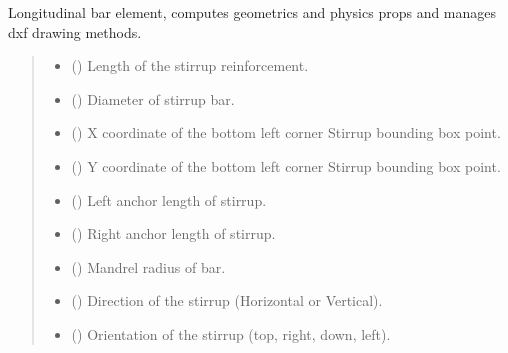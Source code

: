 \documentclass[a4paper,10pt,english]{sphinxmanual}
\begin{document}
\begin{fulllineitems}
\pysigstopsignatures
\sphinxAtStartPar
Longitudinal bar element, computes geometrics and physics props and manages dxf drawing methods.
\begin{quote}\begin{description}
\begin{itemize}
\item {} 
\sphinxAtStartPar
{} () \textendash{} Length of the stirrup reinforcement.

\item {} 
\sphinxAtStartPar
{} () \textendash{} Diameter of stirrup bar.

\item {} 
\sphinxAtStartPar
{} () \textendash{} X coordinate of the bottom left corner Stirrup bounding box point.

\item {} 
\sphinxAtStartPar
{} () \textendash{} Y coordinate of the bottom left corner Stirrup bounding box point.

\item {} 
\sphinxAtStartPar
{} () \textendash{} Left anchor length of stirrup.

\item {} 
\sphinxAtStartPar
{} () \textendash{} Right anchor length of stirrup.

\item {} 
\sphinxAtStartPar
{} () \textendash{} Mandrel radius of bar.

\item {} 
\sphinxAtStartPar
{} () \textendash{} Direction of the stirrup (Horizontal or Vertical).

\item {} 
\sphinxAtStartPar
{} () \textendash{} Orientation of the stirrup (top, right, down, left).


\end{itemize}
\end{description}
\end{quote}
\end{fulllineitems}
\end{document}
